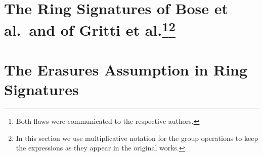 \documentclass{llncs}
\begin{document}
	\section{The Ring Signatures of Bose et al.~and of Gritti et al.\protect\footnote{Both flaws were communicated to the respective authors.}\protect\footnote{In this section we use multiplicative notation for the group operations to keep the expressions as they appear in the original works.}}\label{sec:rs-flawed}
    
        	 
        	 
        	 \section{The Erasures Assumption in Ring Signatures} \label{sec:erasures}
        	 
        	 	

%
%	
%
%		
%
%
%		
%		
%
%
%
%		
%
%
%		
\end{document}
